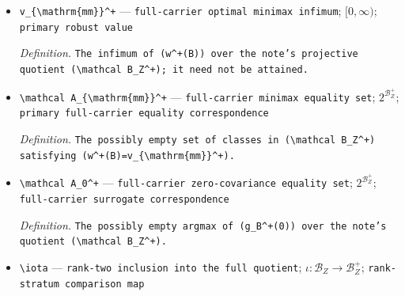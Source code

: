 \documentclass{article}
\begin{document}
\begin{itemize}
  \par\smallskip\noindent\emph{Definition.} \texttt{The maximum of (\textbackslash{}\allowbreak{}ell\_\allowbreak{}B\textasciicircum{}+\allowbreak{}(c\_\allowbreak{}L)) and (\textbackslash{}\allowbreak{}ell\_\allowbreak{}B\textasciicircum{}+\allowbreak{}(c\_\allowbreak{}U)) on (\textbackslash{}\allowbreak{}mathcal B\_\allowbreak{}Z\textasciicircum{}+\allowbreak{}).}
  \item \texttt{v\_\allowbreak{}\{\textbackslash{}\allowbreak{}mathrm\{mm\}\allowbreak{}\}\allowbreak{}\textasciicircum{}+\allowbreak{}} --- \texttt{full-\allowbreak{}carrier optimal minimax infimum}; \([0,\infty)\); \texttt{primary robust value}
  \par\smallskip\noindent\emph{Definition.} \texttt{The infimum of (w\textasciicircum{}+\allowbreak{}(B)) over the note's projective quotient (\textbackslash{}\allowbreak{}mathcal B\_\allowbreak{}Z\textasciicircum{}+\allowbreak{});\allowbreak{} it need not be attained.}
  \item \texttt{\textbackslash{}\allowbreak{}mathcal A\_\allowbreak{}\{\textbackslash{}\allowbreak{}mathrm\{mm\}\allowbreak{}\}\allowbreak{}\textasciicircum{}+\allowbreak{}} --- \texttt{full-\allowbreak{}carrier minimax equality set}; \(2^{\mathcal B_Z^+}\); \texttt{primary full-\allowbreak{}carrier equality correspondence}
  \par\smallskip\noindent\emph{Definition.} \texttt{The possibly empty set of classes in (\textbackslash{}\allowbreak{}mathcal B\_\allowbreak{}Z\textasciicircum{}+\allowbreak{}) satisfying (w\textasciicircum{}+\allowbreak{}(B)=\allowbreak{}v\_\allowbreak{}\{\textbackslash{}\allowbreak{}mathrm\{mm\}\allowbreak{}\}\allowbreak{}\textasciicircum{}+\allowbreak{}).}
  \item \texttt{\textbackslash{}\allowbreak{}mathcal A\_\allowbreak{}0\textasciicircum{}+\allowbreak{}} --- \texttt{full-\allowbreak{}carrier zero-\allowbreak{}covariance equality set}; \(2^{\mathcal B_Z^+}\); \texttt{full-\allowbreak{}carrier surrogate correspondence}
  \par\smallskip\noindent\emph{Definition.} \texttt{The possibly empty argmax of (g\_\allowbreak{}B\textasciicircum{}+\allowbreak{}(0)) over the note's quotient (\textbackslash{}\allowbreak{}mathcal B\_\allowbreak{}Z\textasciicircum{}+\allowbreak{}).}
  \item \texttt{\textbackslash{}\allowbreak{}iota} --- \texttt{rank-\allowbreak{}two inclusion into the full quotient}; \(\iota:\mathcal B_Z\to\mathcal B_Z^+\); \texttt{rank-\allowbreak{}stratum comparison map}

\end{itemize}
\end{document}
